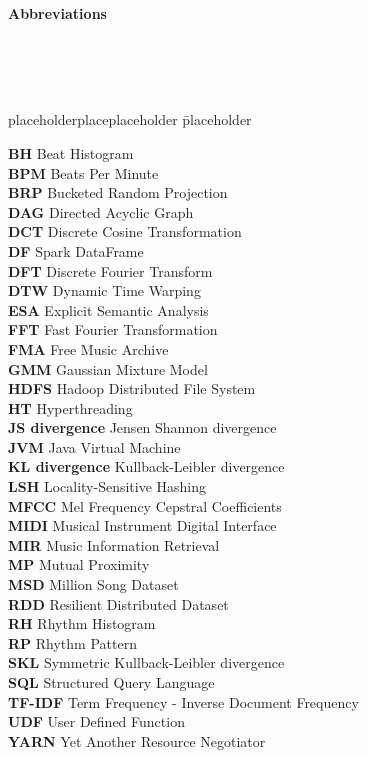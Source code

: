 \documentclass[a4paper,oneside,12pt]{report}
\begin{document}
\begin{flushleft}
\begin{Huge}
\textbf{Abbreviations}
\end{Huge}
\end{flushleft}

\ \\
\ \\
\ \\

\begin{tabbing}
placeholderplaceplaceholder \= placeholder \kill

\textbf{BH} \> Beat Histogram\\
\textbf{BPM} \> Beats Per Minute\\
\textbf{BRP} \> Bucketed Random Projection\\
\textbf{DAG} \> Directed Acyclic Graph\\
\textbf{DCT} \> Discrete Cosine Transformation\\
\textbf{DF} \> Spark DataFrame\\
\textbf{DFT} \> Discrete Fourier Transform\\
\textbf{DTW} \> Dynamic Time Warping\\
\textbf{ESA} \> Explicit Semantic Analysis\\
\textbf{FFT} \> Fast Fourier Transformation\\
\textbf{FMA} \> Free Music Archive\\
\textbf{GMM} \> Gaussian Mixture Model\\
\textbf{HDFS} \> Hadoop Distributed File System\\
\textbf{HT} \> Hyperthreading\\
\textbf{JS divergence} \> Jensen Shannon divergence\\
\textbf{JVM} \> Java Virtual Machine\\
\textbf{KL divergence} \> Kullback-Leibler divergence\\
\textbf{LSH} \> Locality-Sensitive Hashing\\
\textbf{MFCC} \> Mel Frequency Cepstral Coefficients\\
\textbf{MIDI} \> Musical Instrument Digital Interface\\
\textbf{MIR} \> Music Information Retrieval\\
\textbf{MP} \> Mutual Proximity\\
\textbf{MSD} \> Million Song Dataset\\
\textbf{RDD} \> Resilient Distributed Dataset\\
\textbf{RH} \> Rhythm Histogram\\
\textbf{RP} \> Rhythm Pattern\\
\textbf{SKL} \> Symmetric Kullback-Leibler divergence\\
\textbf{SQL} \> Structured Query Language\\
\textbf{TF-IDF} \> Term Frequency - Inverse Document Frequency\\
\textbf{UDF} \> User Defined Function\\
\textbf{YARN} \> Yet Another Resource Negotiator\\



\end{tabbing}
\end{document}

